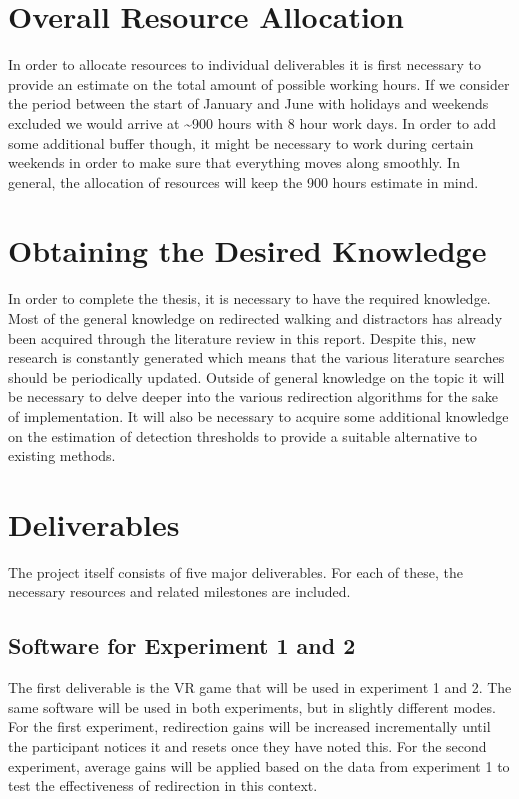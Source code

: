 \section{Overall Resource Allocation}
In order to allocate resources to individual deliverables it is first necessary to provide an estimate on the total amount of possible working hours. If we consider the period between the start of January and June with holidays and weekends excluded we would arrive at \textasciitilde900 hours with 8 hour work days. In order to add some additional buffer though, it might be necessary to work during certain weekends in order to make sure that everything moves along smoothly. In general, the allocation of resources will keep the 900 hours estimate in mind.

\section{Obtaining the Desired Knowledge}
In order to complete the thesis, it is necessary to have the required knowledge. Most of the general knowledge on redirected walking and distractors has already been acquired through the literature review in this report. Despite this, new research is constantly generated which means that the various literature searches should be periodically updated.
Outside of general knowledge on the topic it will be necessary to delve deeper into the various redirection algorithms for the sake of implementation. It will also be necessary to acquire some additional knowledge on the estimation of detection thresholds to provide a suitable alternative to existing methods. 

\section{Deliverables}
The project itself consists of five major deliverables. For each of these, the necessary resources and related milestones are included. 

\subsection{Software for Experiment 1 and 2}
The first deliverable is the VR game that will be used in experiment 1 and 2. The same software will be used in both experiments, but in slightly different modes. For the first experiment, redirection gains will be increased incrementally until the participant notices it and resets once they have noted this. For the second experiment, average gains will be applied based on the data from experiment 1 to test the effectiveness of redirection in this context. 

